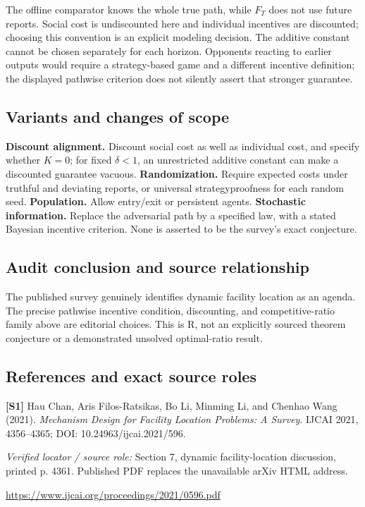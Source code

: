 \documentclass[11pt,a4paper]{article}
\begin{document}
The offline comparator knows the whole true path, while $F_T$ does not use future reports. Social cost is undiscounted here and individual incentives are discounted; choosing this convention is an explicit modeling decision. The additive constant cannot be chosen separately for each horizon. Opponents reacting to earlier outputs would require a strategy-based game and a different incentive definition; the displayed pathwise criterion does not silently assert that stronger guarantee.

\subsection*{Variants and changes of scope}

\textbf{Discount alignment.} Discount social cost as well as individual cost, and specify whether $K=0$; for fixed $\delta<1$, an unrestricted additive constant can make a discounted guarantee vacuous. \textbf{Randomization.} Require expected costs under truthful and deviating reports, or universal strategyproofness for each random seed. \textbf{Population.} Allow entry/exit or persistent agents. \textbf{Stochastic information.} Replace the adversarial path by a specified law, with a stated Bayesian incentive criterion. None is asserted to be the survey's exact conjecture.

\subsection*{Audit conclusion and source relationship}

The published survey genuinely identifies dynamic facility location as an agenda. The precise pathwise incentive condition, discounting, and competitive-ratio family above are editorial choices. This is R, not an explicitly sourced theorem conjecture or a demonstrated unsolved optimal-ratio result.

\subsection*{References and exact source roles}

{\footnotesize\raggedright
\par\noindent\textbf{[S1]} Hau Chan, Aris Filos-Ratsikas, Bo Li, Minming Li, and Chenhao Wang (2021). \emph{Mechanism Design for Facility Location Problems: A Survey}. IJCAI 2021, 4356--4365; DOI: 10.24963/ijcai.2021/596.\par \textit{Verified locator / source role:} Section 7, dynamic facility-location discussion, printed p. 4361. Published PDF replaces the unavailable arXiv HTML address.\par \url{https://www.ijcai.org/proceedings/2021/0596.pdf}\par\smallskip
}
\end{document}
